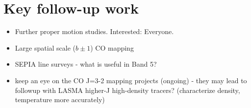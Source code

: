\section{Key follow-up work}
\begin{itemize}
\item Further proper motion studies.  Interested: Everyone.
\item Large spatial scale ($b\pm1$\deg) CO mapping
\item SEPIA line surveys - what is useful in Band 5?
\item keep an eye on the CO J=3-2 mapping projects (ongoing) - they may lead to  followup with LASMA higher-J high-density tracers?  (characterize density, temperature more accurately)
\end{itemize}